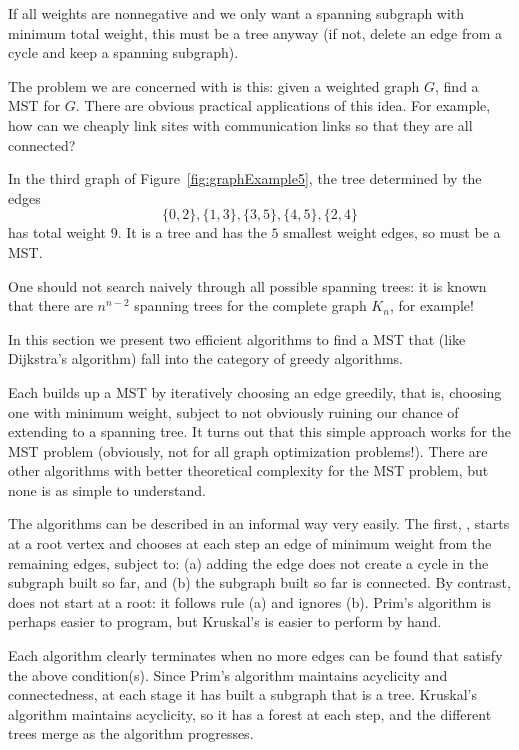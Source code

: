 \begin{note}If all weights are nonnegative and we
only want a spanning subgraph with minimum total weight, this must be a
tree anyway (if not, delete an edge from a cycle and keep a spanning
subgraph).
\end{note}

The problem we are concerned with is this: given a weighted graph $G$,
find a MST for $G$. There are obvious practical applications of this
idea. For example, how can we cheaply link sites with communication
links so that they are all connected?

\begin{Example}
In the third graph of Figure~\ref{fig:graphExample5}, the tree
determined by the edges 
$$\{0, 2\}, \{1, 3\}, \{3, 5\}, \{4, 5\}, \{2, 4\}$$ 
has total weight $9$. It is a tree and has the $5$ smallest weight
edges, so must be a MST.
\end{Example}

One should not search naively through all possible spanning trees: it is
known that there are $n^{n-2}$ spanning trees for the complete graph
$K_n$, for example!

In this section we present two efficient algorithms to find a MST that
(like Dijkstra's algorithm) fall into the category of greedy algorithms. 

Each builds up a MST by iteratively choosing an edge greedily, that is,
choosing one with minimum weight, subject to not obviously ruining our
chance of extending to a spanning tree. It turns out that this simple
approach works for the MST problem (obviously, not for all graph
optimization problems!). There are other algorithms with better
theoretical complexity for the MST problem, but none is as simple to
understand.

The algorithms can be described in an informal way very easily. The
first, , starts at a root vertex and chooses
at each step an edge of minimum weight from the remaining edges, subject
to: (a) adding the edge does not create a cycle in the subgraph built so
far, and (b) the subgraph built so far is connected. By contrast,
 does not start at a root: it follows
rule (a) and ignores (b). Prim's algorithm is perhaps easier to program,
but Kruskal's is easier to perform by hand.

Each algorithm clearly terminates when no more edges can be found
that satisfy the above condition(s). Since Prim's algorithm maintains
acyclicity and connectedness, at each stage it has built a subgraph that
is a tree. Kruskal's algorithm maintains acyclicity, so it has a forest
at each step, and the different trees merge as the algorithm progresses.

